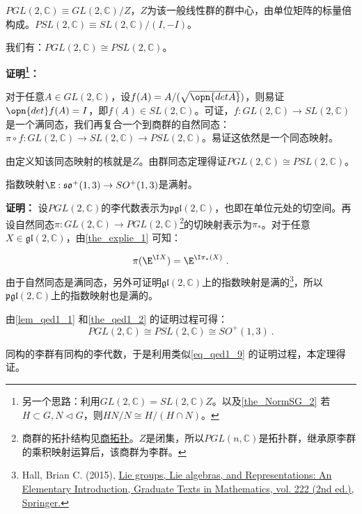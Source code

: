 \begin{lemma}{}\label{lem_qed1_1}
$PGL(2,\mathbb C)\equiv GL(2,\mathbb C)/Z$，$Z$为该一般线性群的群中心，由单位矩阵的标量倍构成。$PSL(2,\mathbb C)\equiv SL(2,\mathbb C)/(I,-I)$。

我们有：$PGL(2,\mathbb C)\cong PSL(2,\mathbb C)$。

\textbf{证明\footnote{另一个思路：利用$GL(2,\mathbb C)=SL(2,\mathbb C)Z$。以及\autoref{the_NormSG_2} 若$H\subset G,N\vartriangleleft G$，则$HN/N\cong H/(H\cap N)$。}：}

对于任意$A\in GL(2,\mathbb C)$，设$f(A)=A/(\sqrt{\opn{det A}})$，则易证$\opn{det}f(A)=I$，即$f(A)\in SL(2,\mathbb C)$。可证，$f:GL(2,\mathbb C)\rightarrow SL(2,\mathbb C)$是一个满同态，我们再复合一个到商群的自然同态：$\pi\circ f: GL(2,\mathbb C)\to SL(2,\mathbb C)\to PSL(2,\mathbb C)$。易证这依然是一个同态映射。

由定义知该同态映射的核就是$Z$。由群同态定理得证$PGL(2,\mathbb C)\cong PSL(2,\mathbb C)$。

\end{lemma}
\begin{theorem}{}
指数映射$\E:\mathfrak {so}^+(1,3)\to SO^+(1,3)$是满射。
\end{theorem}


\textbf{证明：}
设$PGL(2,\mathbb C)$的李代数表示为$\mathfrak{pgl}(2,\mathbb C)$，也即在单位元处的切空间。再设自然同态$\pi:GL(2,\mathbb C)\to PGL(2,\mathbb C)$\footnote{商群的拓扑结构见\href{https://wuli.wiki/online/Topo7.html}{商拓扑}。$Z$是闭集，所以$PGL(n,\mathbb C)$是拓扑群，继承原李群的乘积映射运算后，该商群为李群。}的切映射表示为$\pi_*$。对于任意$X\in \mathfrak{gl}(2,\mathbb C)$，由\autoref{the_explie_1} 可知：

\begin{equation}\label{eq_qed1_9}
\pi(\E^{\I X})=\E^{\I\pi_*(X)}~.
\end{equation}
由于自然同态是满同态，另外可证明$\mathfrak{gl}(2,\mathbb C)$上的指数映射是满的\footnote{Hall, Brian C. (2015), \href{https://link.springer.com/book/10.1007/978-3-319-13467-3}{Lie groups, Lie algebras, and Representations: An Elementary Introduction, Graduate Texts in Mathematics, vol. 222 (2nd ed.), Springer.}}，所以$\mathfrak{pgl}(2,\mathbb C)$上的指数映射也是满的。


由\autoref{lem_qed1_1} 和\autoref{the_qed1_2} 的证明过程可得：
\begin{equation}
PGL(2,\mathbb C)\cong PSL(2,\mathbb C)\cong SO^+(1,3)~.
\end{equation}

同构的李群有同构的李代数，于是利用类似\autoref{eq_qed1_9} 的证明过程，本定理得证。


























